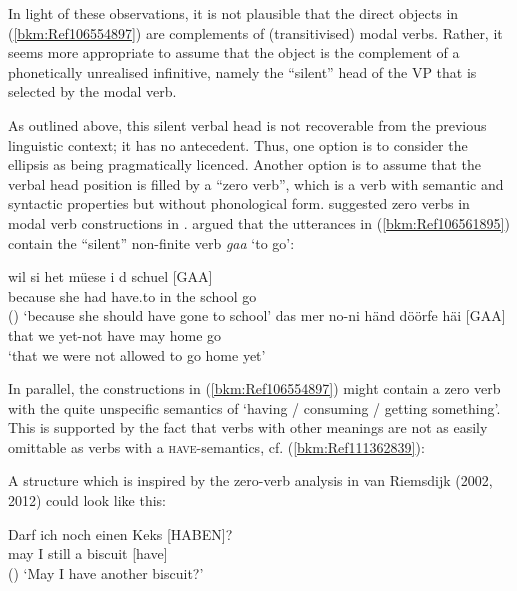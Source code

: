 \documentclass[output=paper
  ,nobabel
  ,draftmode
  ,colorlinks, citecolor=brown
]{langscibook}
\begin{document}
\noindent
In light of these observations, it is not plausible that the direct objects in
(\ref{bkm:Ref106554897}) are complements of (transitivised) modal verbs. Rather, it seems more
appropriate to assume that the object is the complement of a phonetically unrealised infinitive,
namely the ``silent'' head of the VP that is selected by the modal verb.

As outlined above, this silent verbal head is not recoverable from the previous linguistic context;
it has no antecedent. Thus, one option is to consider the ellipsis as being pragmatically
licenced. Another option is to assume that the verbal head position is filled by a ``zero verb'',
which is a verb with semantic and syntactic properties but without phonological
form.  suggested zero verbs in modal verb constructions in
.  argued that the utterances in (\ref{bkm:Ref106561895})
contain the ``silent'' non-finite verb \emph{gaa} `to go':



\eal
\label{bkm:Ref106561895}
\ex
\gll wil           si    het    müese    i    d     schuel   [GAA]\\
       because   she  had  have.to  in   the  school  go\\\hfill()
\glt   `because she should have gone to school'
\ex
\gll das   mer  no-ni        händ  döörfe  häi       [GAA]\\
       that  we    yet-not    have  may      home   go \\
\glt   `that we were not allowed to go home yet'
\zl

\noindent
In parallel, the constructions in (\ref{bkm:Ref106554897}) might contain a zero verb with the quite
unspecific semantics of `having / consuming / getting something'. This is supported by the fact that
verbs with other meanings are not as easily omittable as verbs with a \textsc{have}{}-semantics,
cf. (\ref{bkm:Ref111362839}):

\z
\noindent
A structure which is inspired by the zero-verb analysis in van Riemsdijk (2002, 2012) could look
like this:

\eal
\label{bkm:Ref106563285}
\ex
\gll Darf  ich  noch  einen   Keks     [\MakeUppercase{haben}]?\\
       may  I      still    a          biscuit  [have]\\\hfill()
\glt   `May I have another biscuit?'
\end{document}
